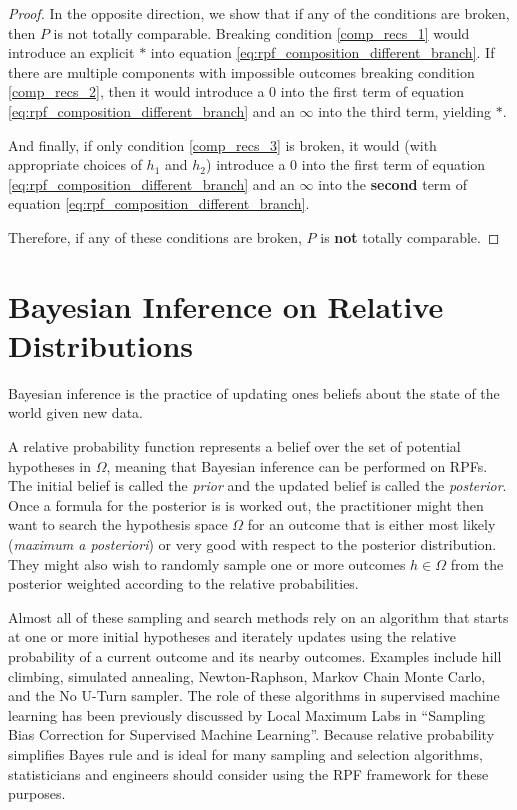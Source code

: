 \documentclass[twoside]{article}
\theoremstyle{plain}%
\theoremstyle{definition}
\theoremstyle{remark}
\begin{document}
\begin{proof}
In the opposite direction, we show that if any of the conditions are broken, then \(P\) is not totally comparable. Breaking condition \ref{comp_recs_1} would introduce an explicit \(\ast\) into equation \ref{eq:rpf_composition_different_branch}. If there are multiple components with impossible outcomes breaking condition \ref{comp_recs_2}, then it would introduce a \(0\) into the first term of equation \ref{eq:rpf_composition_different_branch} and an \(\infty\) into the third term, yielding \(\ast\).

And finally, if only condition \ref{comp_recs_3} is broken, it would (with appropriate choices of \(h_1\) and \(h_2\)) introduce a 0 into the first term of equation \ref{eq:rpf_composition_different_branch} and an \(\infty\) into the \textbf{second} term of equation \ref{eq:rpf_composition_different_branch}.

Therefore, if any of these conditions are broken, \(P\) is \textbf{not} totally comparable.
\end{proof}

\section{Bayesian Inference on Relative Distributions}

Bayesian inference is the practice of updating ones beliefs about the state of the world given new data.

A relative probability function represents a belief over the set of potential hypotheses in \(\Omega\), meaning that Bayesian inference can be performed on RPFs. The initial belief is called the \textit{prior} and the updated belief is called the \textit{posterior}. Once a formula for the posterior is is worked out, the practitioner might then want to search the hypothesis space \(\Omega\) for an outcome that is either most likely (\textit{maximum a posteriori}) or very good with respect to the posterior distribution. They might also wish to randomly sample one or more outcomes \(h \in \Omega\) from the posterior weighted according to the relative probabilities.

Almost all of these sampling and search methods rely on an algorithm that starts at one or more initial hypotheses and iterately updates using the relative probability of a current outcome and its nearby outcomes. Examples include hill climbing, simulated annealing, Newton-Raphson, Markov Chain Monte Carlo, and the No U-Turn sampler. The role of these algorithms in supervised machine learning has been previously discussed by Local Maximum Labs in ``Sampling Bias Correction for Supervised Machine Learning\cite{sklar_bias}''. Because relative probability simplifies Bayes rule and is ideal for many sampling and selection algorithms, statisticians and engineers should consider using the RPF framework for these purposes.
\end{document}
